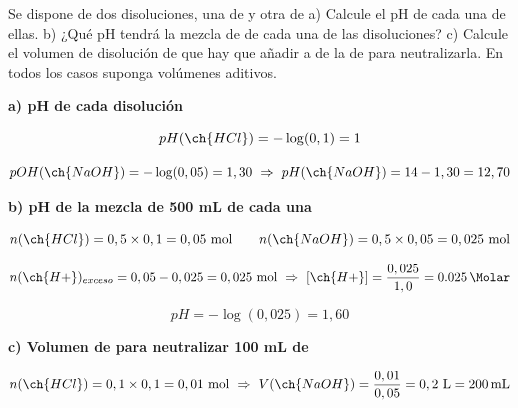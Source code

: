 \begin{exerciseEVAU}
    Se dispone de dos disoluciones, una de    y otra de   a) Calcule el pH de cada una de ellas. b) ¿Qué pH tendrá la mezcla de  de cada una de las disoluciones? c) Calcule el volumen de disolución de   que hay que añadir a  de la de  para neutralizarla. En todos los casos suponga volúmenes aditivos.


    \begin{solu}


        \textbf{a) pH de cada disolución}

        \begin{equation*}
            pH(\ch{HCl}) = -\log(0,1) = 1
        \end{equation*}

        \begin{equation*}
            pOH(\ch{NaOH}) = -\log(0,05) = 1,30 \ \Rightarrow \ pH(\ch{NaOH}) = 14-1,30 = 12,70
        \end{equation*}

        \textbf{b) pH de la mezcla de 500 mL de cada una}

        \begin{equation*}
            n(\ch{HCl}) = 0,5\times0,1 = 0,05 \ \text{mol} \qquad n(\ch{NaOH}) = 0,5\times0,05 = 0,025 \ \text{mol}
        \end{equation*}

        \begin{equation*}
            n(\ch{H+})_{exceso} = 0,05-0,025 = 0,025 \ \text{mol} \ \Rightarrow \ [\ch{H+}] = \dfrac{0,025}{1,0} = \SI{0.025}{\Molar}
        \end{equation*}

        \begin{equation*}
            pH = -\log(0,025) = 1,60
        \end{equation*}

        \textbf{c) Volumen de  para neutralizar 100 mL de }

        \begin{equation*}
            n(\ch{HCl}) = 0,1\times0,1 = 0,01 \ \text{mol} \ \Rightarrow \ V(\ch{NaOH}) = \dfrac{0,01}{0,05} = 0,2 \ \si{\litre} = \SI{200}{\milli\litre}
        \end{equation*}

    \end{solu}
\end{exerciseEVAU}

